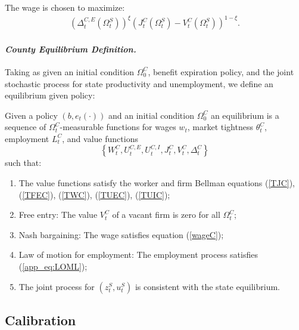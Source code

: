 \documentclass[12pt]{article}
\newcommand{\1}{\mathbf{1}}
\newcommand{\beq}{\begin{eqnarray}}
\newcommand{\eeq}{\end{eqnarray}}
\newenvironment{definition}[1][Definition]{\begin{trivlist}
\item[\hskip \labelsep {\bfseries #1}]}{\end{trivlist}}
\newcommand{\tct}{\theta^C_t}
\newcommand{\ost}{\Omega^S_t}
\newcommand{\oct}{\Omega^C_t}
\begin{document}
\begin{appendix}
The wage is chosen to maximize:
\beq
\left(\Delta_t^{C,E}\left(\ost\right)\right)^\xi\left(J^C_t\left(\ost\right)-V^C_t\left(\ost\right)\right)^{1-\xi}.
\label{wageC}
\eeq

\vspace{-0.4cm}\paragraph{\textit{County Equilibrium Definition.}}
Taking as given an initial condition $\Omega^C_0$, benefit expiration policy, and the joint stochastic process for state productivity and unemployment, we define an equilibrium given policy:

\begin{definition}
Given a policy $\left(b,e_t\left(\cdot\right)\right)$ and an initial condition $\Omega^C_0$ an equilibrium is a sequence of $\oct$-measurable functions for wages $w_t$, market tightness $\tct$, employment $L^C_t$, and value functions
\[\left\{W^C_t, U_t^{C,E}, U_t^{C,I}, J^C_t, V^C_t, \Delta^C_t\right\}\] such that:
\begin{enumerate}
\vspace{-0.2cm}\item The value functions satisfy the worker and firm Bellman equations (\ref{TJC}), (\ref{TFEC}), (\ref{TWC}), (\ref{TUEC}),  (\ref{TUIC});
\vspace{-0.2cm}\item Free entry: The value $V^C_t$ of a vacant firm is zero for all $\oct$;
\vspace{-0.2cm}\item Nash bargaining: The wage satisfies equation (\ref{wageC});
\vspace{-0.2cm}\item Law of motion for employment: The employment process satisfies (\ref{app_eq:LOML});
\vspace{-0.2cm}\item The joint process for $\left(z^S_t,u^S_t\right)$ is consistent with the state equilibrium.
\end{enumerate}
\end{definition}

\subsection{Calibration}


\end{appendix}
\end{document}
